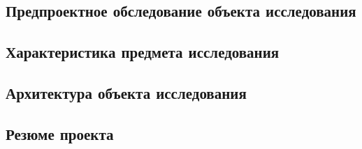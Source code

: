 \documentclass[14pt, a4paper]{extarticle}
\begin{document}
\subsection{Предпроектное обследование объекта исследования}


\subsection{Характеристика предмета исследования}



\subsection{Архитектура объекта исследования}



\subsection{Резюме проекта}

\begingroup 
\let\itshape\upshape 
\sloppy
\raggedright
\printbibliography[title=СПИСОК ИСПОЛЬЗУЕМЫХ ИСТОЧНИКОВ]
{}
\endgroup
\end{document}
